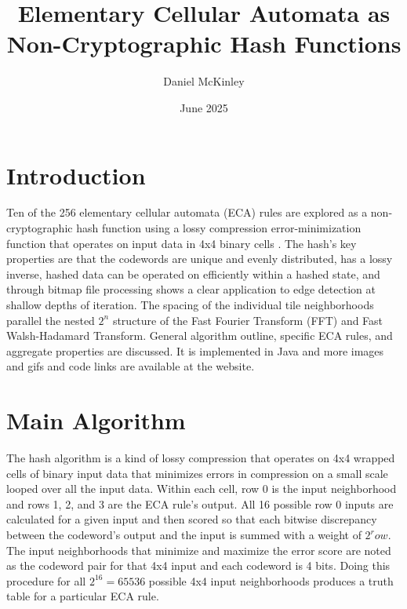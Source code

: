 \documentclass[11pt]{article}
\title{Elementary Cellular Automata as Non-Cryptographic Hash Functions}
\date{June 2025}
\author{Daniel McKinley}
\begin{document}
\maketitle

\section{Introduction}

Ten of the 256 elementary cellular automata (ECA) rules are explored as a non-cryptographic hash function using a lossy compression error-minimization function that operates on input data in 4x4 binary cells \cite{Wolfram}. The hash's key properties are that the codewords are unique and evenly distributed, has a lossy inverse, hashed data can be operated on efficiently within a hashed state, and through bitmap file processing shows a clear application to edge detection at shallow depths of iteration.  The spacing of the individual tile neighborhoods parallel the nested $2^n$ structure of the Fast Fourier Transform (FFT) and Fast Walsh-Hadamard Transform. General algorithm outline, specific ECA rules, and aggregate properties are discussed. It is implemented in Java and more images and gifs and code links are available at the website\cite{dmwebsite}.\\

\section{Main Algorithm}
The hash algorithm is a kind of lossy compression that operates on 4x4 wrapped cells of binary input data that minimizes errors in compression on a small scale looped over all the input data. Within each cell, row 0 is the input neighborhood and rows 1, 2, and 3 are the ECA rule's output. All 16 possible row 0 inputs are calculated for a given input and then scored so that each bitwise discrepancy between the codeword's output and the input is summed with a weight of $2^row$. The input neighborhoods that minimize and maximize the error score are noted as the codeword pair for that 4x4 input and each codeword is 4 bits. Doing this procedure for all  $2^{16}=65536$ possible 4x4 input neighborhoods produces a truth table for a particular ECA rule.\\
\end{document}
